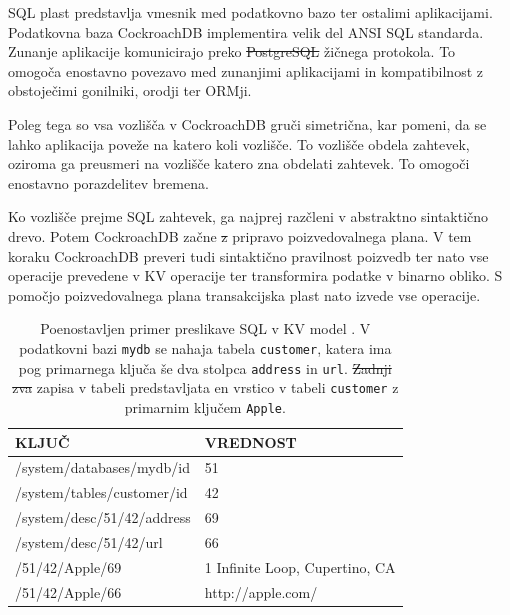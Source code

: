 \documentclass[a4paper, 12pt]{book}
\providecommand{\DIFaddtex}[1]{{\protect\color{blue}\uwave{#1}}} %
\providecommand{\DIFdeltex}[1]{{\protect\color{red}\sout{#1}}}                      %
\providecommand{\DIFaddbegin}{} %
\providecommand{\DIFaddend}{} %
\providecommand{\DIFdelbegin}{} %
\providecommand{\DIFdelend}{} %
\providecommand{\DIFaddFL}[1]{\DIFadd{#1}} %
\providecommand{\DIFdelFL}[1]{\DIFdel{#1}} %
\providecommand{\DIFaddbeginFL}{} %
\providecommand{\DIFaddendFL}{} %
\providecommand{\DIFdelbeginFL}{} %
\providecommand{\DIFdelendFL}{} %
\providecommand{\DIFadd}[1]{\texorpdfstring{\DIFaddtex{#1}}{#1}} %
\providecommand{\DIFdel}[1]{\texorpdfstring{\DIFdeltex{#1}}{}} %
\newcommand{\DIFscaledelfig}{0.5}
\newlength{\DIFdelgraphicswidth} %
\newlength{\DIFdelgraphicsheight} %
\newcommand{\DIFaddincludegraphics}[2][]{{\color{blue}\fbox{\DIFOincludegraphics[#1]{#2}}}} %
\newcommand{\DIFdelincludegraphics}[2][]{%
\sbox{\DIFdelgraphicsbox}{\DIFOincludegraphics[#1]{#2}}%
\settoboxwidth{\DIFdelgraphicswidth}{\DIFdelgraphicsbox} %
\settoboxtotalheight{\DIFdelgraphicsheight}{\DIFdelgraphicsbox} %
\scalebox{\DIFscaledelfig}{%
\parbox[b]{\DIFdelgraphicswidth}{\usebox{\DIFdelgraphicsbox}\\[-\baselineskip] \rule{\DIFdelgraphicswidth}{0em}}\llap{\resizebox{\DIFdelgraphicswidth}{\DIFdelgraphicsheight}{%
\setlength{\unitlength}{\DIFdelgraphicswidth}%
\begin{picture}(1,1)%
\thicklines\linethickness{2pt} %
{\color[rgb]{1,0,0}\put(0,0){\framebox(1,1){}}}%
{\color[rgb]{1,0,0}\put(0,0){\line( 1,1){1}}}%
{\color[rgb]{1,0,0}\put(0,1){\line(1,-1){1}}}%
\end{picture}%
}\hspace*{3pt}}} %
} %
\DeclareRobustCommand{\DIFaddbegin}{\DIFOaddbegin \let\includegraphics\DIFaddincludegraphics} %
\DeclareRobustCommand{\DIFaddend}{\DIFOaddend \let\includegraphics\DIFOincludegraphics} %
\DeclareRobustCommand{\DIFdelbegin}{\DIFOdelbegin \let\includegraphics\DIFdelincludegraphics} %
\DeclareRobustCommand{\DIFdelend}{\DIFOaddend \let\includegraphics\DIFOincludegraphics} %
\DeclareRobustCommand{\DIFaddbeginFL}{\DIFOaddbeginFL \let\includegraphics\DIFaddincludegraphics} %
\DeclareRobustCommand{\DIFaddendFL}{\DIFOaddendFL \let\includegraphics\DIFOincludegraphics} %
\DeclareRobustCommand{\DIFdelbeginFL}{\DIFOdelbeginFL \let\includegraphics\DIFdelincludegraphics} %
\DeclareRobustCommand{\DIFdelendFL}{\DIFOaddendFL \let\includegraphics\DIFOincludegraphics} %
\begin{document}
SQL plast predstavlja vmesnik med podatkovno bazo ter ostalimi aplikacijami.  Podatkovna baza CockroachDB implementira velik del ANSI SQL standarda. Zunanje aplikacije komunicirajo preko \DIFdelbegin \DIFdel{PostgreSQL }\DIFdelend \DIFaddbegin \DIFadd{Postgres }\DIFaddend žičnega protokola. To omogoča enostavno povezavo med zunanjimi aplikacijami in kompatibilnost z obstoječimi gonilniki, orodji ter ORMji.

Poleg tega so vsa vozlišča v CockroachDB gruči simetrična, kar pomeni, da se lahko aplikacija poveže na katero koli vozlišče. To vozlišče obdela zahtevek, oziroma ga preusmeri na vozlišče katero zna obdelati zahtevek. To omogoči enostavno porazdelitev bremena.

Ko vozlišče prejme SQL zahtevek, ga najprej razčleni v abstraktno sintaktično drevo. Potem CockroachDB začne \DIFdelbegin \DIFdel{z }\DIFdelend \DIFaddbegin \DIFadd{s }\DIFaddend pripravo poizvedovalnega plana. V tem koraku CockroachDB preveri tudi sintaktično pravilnost poizvedb ter nato vse operacije prevedene v KV operacije ter transformira podatke v binarno obliko. S pomočjo poizvedovalnega plana transakcijska plast nato izvede vse operacije.

\begin{table}[H]
\begin{center}
\begin{tabular}{ |l|l| } 
\hline
\textbf{KLJUČ} & \textbf{VREDNOST} \\
\hline
/system/databases/mydb/id & 51 \\
/system/tables/customer/id & 42 \\ 
/system/desc/51/42/address & 69 \\ 
/system/desc/51/42/url & 66 \\
/51/42/Apple/69 & 1 Infinite Loop, Cupertino, CA \\
/51/42/Apple/66 & http://apple.com/ \\
\hline
\end{tabular}
\end{center}
\caption{Poenostavljen primer preslikave SQL v KV model \cite{CRDB-design}. V podatkovni bazi \texttt{mydb} se nahaja tabela \texttt{customer}, katera ima pog primarnega ključa še dva stolpca \texttt{address} in \texttt{url}. \DIFdelbeginFL \DIFdelFL{Zadnji zva }\DIFdelendFL \DIFaddbeginFL \DIFaddFL{Zadnja dva }\DIFaddendFL zapisa v tabeli predstavljata en vrstico v tabeli \texttt{customer} z primarnim ključem \texttt{Apple}.}
\label{tbl_crdb_sql_kv_mapping}
\end{table}
\end{document}
